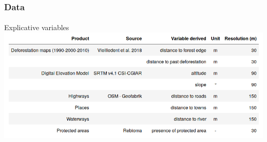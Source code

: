 \documentclass[slidetop,10pt,dvipsnames,leqno,fleqn]{beamer} %
\begin{document}
\begin{frame}
  \frametitle{Data}
  \framesubtitle{}
  \begin{block}{Explicative variables}
    \centering \includegraphics[width=\textwidth]{./Figures/variables.png}\\
  \end{block}
\end{frame}
\end{document}
